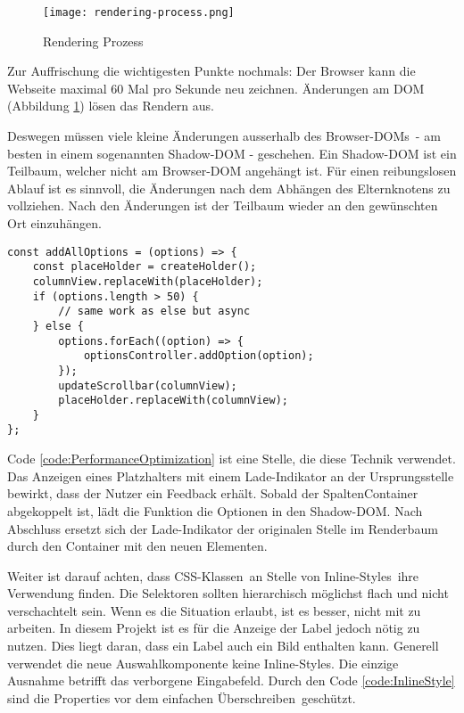 \begin{figure}[!htb]
    \centering
    \texttt{[image: rendering-process.png]}
    \caption{Rendering Prozess}
    \label{img:RenderingProcessRecap}
\end{figure}

Zur Auffrischung die wichtigesten Punkte nochmals: 
Der Browser kann die Webseite maximal 60 Mal pro Sekunde neu zeichnen.
Änderungen am DOM (Abbildung \ref{img:RenderingProcessRecap}) lösen das Rendern aus. 

Deswegen müssen viele kleine Änderungen ausserhalb des Browser-DOMs\footnotemark \ - am besten in einem sogenannten Shadow-DOM - geschehen.
Ein Shadow-DOM ist ein Teilbaum, welcher nicht am Browser-DOM angehängt ist.
Für einen reibungslosen Ablauf ist es sinnvoll, die Änderungen nach dem Abhängen des Elternknotens zu vollziehen. 
Nach den Änderungen ist der Teilbaum wieder an den gewünschten Ort einzuhängen.

\begin{lstlisting}[style = htmlcssjs, caption = Performance Optimierung (aus \codestyle{columnOptionsComponent.js}), label = code:PerformanceOptimization]
const addAllOptions = (options) => {
    const placeHolder = createHolder();
    columnView.replaceWith(placeHolder);
    if (options.length > 50) {
        // same work as else but async
    } else {
        options.forEach((option) => {
            optionsController.addOption(option);
        });
        updateScrollbar(columnView);
        placeHolder.replaceWith(columnView);
    }
};
\end{lstlisting}

Code \ref{code:PerformanceOptimization} ist eine Stelle, die diese Technik verwendet.
Das Anzeigen eines Platzhalters mit einem Lade-Indikator an der Ursprungsstelle bewirkt, dass der Nutzer ein Feedback erhält.
Sobald der SpaltenContainer abgekoppelt ist, lädt die Funktion die Optionen in den Shadow-DOM.
Nach Abschluss ersetzt sich der Lade-Indikator der originalen Stelle im Renderbaum durch den Container mit den neuen Elementen.  

Weiter ist darauf achten, dass CSS-Klassen\footnotemark \ an Stelle von Inline-Styles\footnotemark \ ihre Verwendung finden.
Die Selektoren sollten hierarchisch möglichst flach und nicht verschachtelt sein.
Wenn es die Situation erlaubt, ist es besser, nicht mit  zu arbeiten.
In diesem Projekt ist es für die Anzeige der Label jedoch nötig  zu nutzen.
Dies liegt daran, dass ein Label auch ein Bild enthalten kann.
Generell verwendet die neue Auswahlkomponente keine Inline-Styles.
Die einzige Ausnahme betrifft das verborgene Eingabefeld. 
Durch den Code \ref{code:InlineStyle} sind die Properties vor dem einfachen Überschreiben\footnotemark \ geschützt.

